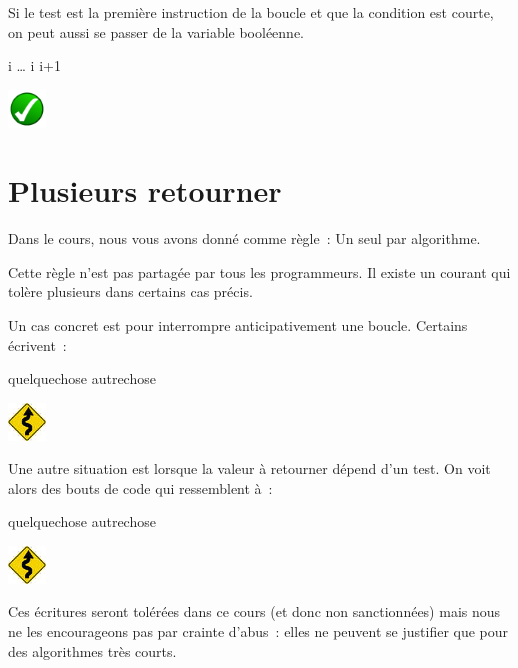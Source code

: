 	\bigskip
	\begin{minipage}{6cm}
	Si le test est la première instruction de la boucle
	et que la condition est courte,
	on peut aussi se passer de la variable booléenne.
	\end{minipage}
	\quad
	\begin{minipage}[t]{7cm}
		\vskip-8mm
		\begin{LDA}
		\Let i 
			\Stmt \dots
			\Let i \Gets i+1
		\EndWhile
		\end{LDA}
	\end{minipage}
	\hskip-5mm
	\includegraphics[width=1cm]{icon/do}

\section{Plusieurs retourner}
	
	Dans le cours,
	nous vous avons donné comme règle~:
	\og{}Un seul  par algorithme\fg{}.

	Cette règle n’est pas partagée par tous les programmeurs.
	Il existe un courant qui tolère plusieurs \lda{retourner}
	dans certains cas précis.

	\begin{minipage}{7cm}
		Un cas concret est pour interrompre anticipativement une boucle.
		Certains écrivent~:
	\end{minipage}
	\quad
	\begin{minipage}{6cm}
		\begin{LDA}
			\For{i}{1}{n}
				\If{\dots}
					\Return quelquechose
				\EndIf
			\EndFor
			\Return autrechose
		\end{LDA}
	\end{minipage}
	\hskip-5mm
	\includegraphics[width=1cm]{icon/caution}
	
	\bigskip
	\begin{minipage}{7cm}
		Une autre situation est lorsque la valeur à retourner dépend d’un test.
		On voit alors des bouts de code qui ressemblent à~:
	\end{minipage}
	\quad
	\begin{minipage}{6cm}
		\begin{LDA}
			\If{\dots}
				\Return quelquechose
			\Else
				\Return autrechose
			\EndIf
		\end{LDA}
	\end{minipage}
	\hskip-5mm
	\includegraphics[width=1cm]{icon/caution}
	
	Ces écritures seront tolérées dans ce cours
	(et donc non sanctionnées)
	mais nous ne les encourageons pas
	par crainte d’abus~: elles ne peuvent se
	justifier que pour des algorithmes très courts.
	
